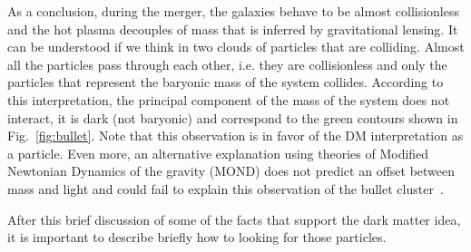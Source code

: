\begin{itemize}
As a conclusion, during the merger, the galaxies behave to be almost collisionless and the hot plasma decouples of mass that is inferred by gravitational lensing. 
It can be understood if we think in two clouds of particles that are colliding. Almost all the particles pass through each other, i.e. they are collisionless and only the particles that represent the baryonic mass of the system collides.
According to this interpretation, the principal component of the mass of the system does not interact, it is dark (not baryonic) and correspond to the green contours shown in Fig.~\ref{fig:bullet}. 
%
Note that this observation is in favor of the DM interpretation as a particle. Even more, an alternative explanation using theories of Modified Newtonian Dynamics of the gravity  (MOND) does not predict an offset between mass and light and could fail to explain this observation of the bullet cluster~\cite{Angus:2006qy}.

\end{itemize}








After this brief discussion of some of the facts that support the dark matter idea, it is important to describe briefly how to looking for  those  particles. 










